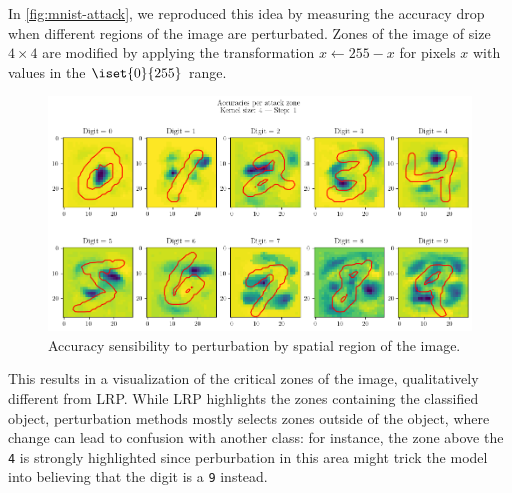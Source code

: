 \documentclass{../cs-classes/cs-classes}
\newcommand*{\1}{\digitsbb{1}}
\newcommand*{\0}{\digitsbb{0}}
\begin{document}
In \autoref{fig:mnist-attack}, we reproduced this idea by measuring the accuracy drop when different regions of the image are perturbated. Zones of the image of size $4\times4$ are modified by applying the transformation $x\longleftarrow255-x$ for pixels $x$ with values in the $\iset{0}{255}$ range. 
\begin{figure}[H]
    \centering
    \includegraphics[width=.8\textwidth]{attacks.png}
    \caption{Accuracy sensibility to perturbation by spatial region of the image.}
    \label{fig:mnist-attack}
\end{figure}
This results in a visualization of the critical zones of the image, qualitatively different from LRP. While LRP highlights the zones containing the classified object, perturbation methods mostly selects zones outside of the object, where change can lead to confusion with another class: for instance, the zone above the \texttt{4} is strongly highlighted since perburbation in this area might trick the model into believing that the digit is a \texttt{9} instead.
\end{document}
